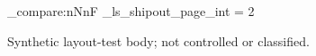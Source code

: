 \documentclass{linearspace-memo}
\begin{document}
\LSMakeMemoHeader
\ExplSyntaxOn
\int_compare:nNnF {\g_ls_shipout_page_int} = {2}
  {\PackageError{linearspace-test}{Full-combination~memo~cover~and~required~release-notice~page~count~regression}{}}
\ExplSyntaxOff
Synthetic layout-test body; not controlled or classified.
\end{document}
